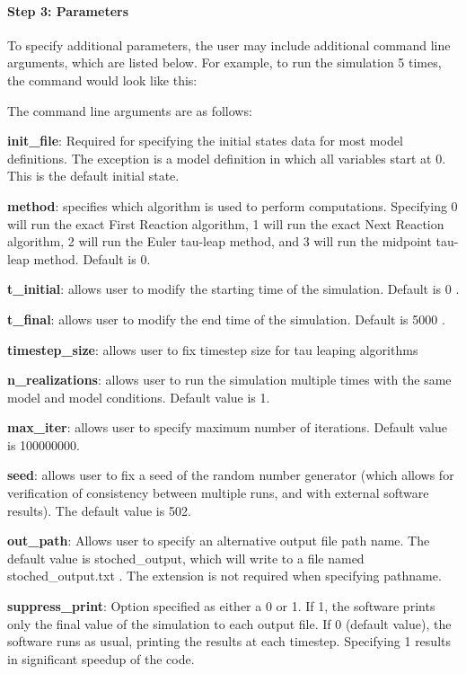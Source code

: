 \paragraph*{Step 3\+: Parameters}

To specify additional parameters, the user may include additional command line arguments, which are listed below. For example, to run the simulation 5 times, the command would look like this\+: 


The command line arguments are as follows\+:

{\bfseries init\+\_\+file}\+: Required for specifying the initial states data for most model definitions. The exception is a model definition in which all variables start at 0. This is the default initial state.

{\bfseries method}\+: specifies which algorithm is used to perform computations. Specifying 0 will run the exact First Reaction algorithm, 1 will run the exact Next Reaction algorithm, 2 will run the Euler tau-\/leap method, and 3 will run the midpoint tau-\/leap method. Default is 0.

{\bfseries t\+\_\+initial}\+: allows user to modify the starting time of the simulation. Default is 0 .

{\bfseries t\+\_\+final}\+: allows user to modify the end time of the simulation. Default is 5000 .

{\bfseries timestep\+\_\+size}\+: allows user to fix timestep size for tau leaping algorithms

{\bfseries n\+\_\+realizations}\+: allows user to run the simulation multiple times with the same model and model conditions. Default value is 1.

{\bfseries max\+\_\+iter}\+: allows user to specify maximum number of iterations. Default value is 100000000.

{\bfseries seed}\+: allows user to fix a seed of the random number generator (which allows for verification of consistency between multiple runs, and with external software results). The default value is 502.

{\bfseries out\+\_\+path}\+: Allows user to specify an alternative output file path name. The default value is stoched\+\_\+output, which will write to a file named stoched\+\_\+output.\+txt . The extension is not required when specifying pathname.

{\bfseries suppress\+\_\+print}\+: Option specified as either a 0 or 1. If 1, the software prints only the final value of the simulation to each output file. If 0 (default value), the software runs as usual, printing the results at each timestep. Specifying 1 results in significant speedup of the code. 